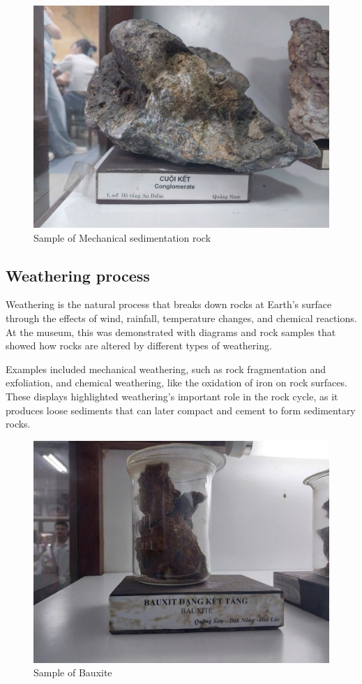 \begin{figure}[H]
  \centering
  \includegraphics[max width=0.8\linewidth]{graphics/figure_09.jpg}
  \caption{Sample of Mechanical sedimentation rock}
  \label{fig:mechanical-sedimentation}
\end{figure}

\subsection{Weathering process}
\label{subsec:weathering-process}

Weathering is the natural process that breaks down rocks at Earth's surface through the effects of wind, rainfall, temperature changes, and chemical reactions. At the museum, this was demonstrated with diagrams and rock samples that showed how rocks are altered by different types of weathering.

Examples included mechanical weathering, such as rock fragmentation and exfoliation, and chemical weathering, like the oxidation of iron on rock surfaces. These displays highlighted weathering's important role in the rock cycle, as it produces loose sediments that can later compact and cement to form sedimentary rocks.

\begin{figure}[H]
  \centering
  \includegraphics[max width=0.8\linewidth]{graphics/figure_10.jpg}
\caption{Sample of Bauxite}
\label{fig:bauxite}
\end{figure}